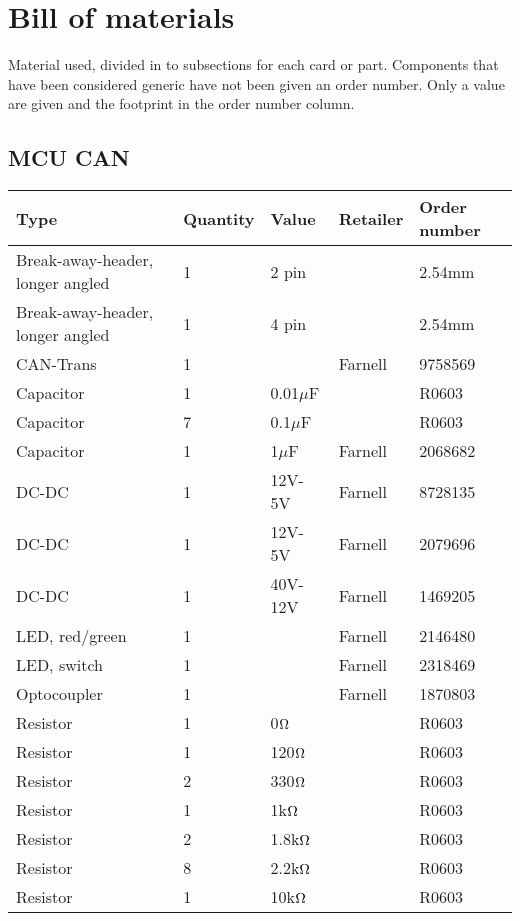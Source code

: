 \documentclass[10pt, titlepage]{article}
\begin{document}
\section{Bill of materials}
\label{Bill of material}
Material used, divided in to subsections for each card or part. Components that have been considered generic have not been given an order number. Only a value are given and the footprint in the order number column.
 
\subsection{MCU CAN}
\begin{center}
\begin{tabularx}{\textwidth}{|X|l|l|l|l|}
\hline
\textbf{Type} & \textbf{Quantity} & \textbf{Value} & \textbf{Retailer} & \textbf{Order number} \\ \hline
Break-away-header, longer angled & 1 & 2 pin & & 2.54mm \\ \hline
Break-away-header, longer angled & 1 & 4 pin & & 2.54mm\\ \hline
CAN-Trans & 1 & & Farnell & 9758569	\\ \hline
Capacitor & 1 & 0.01$\mu$F & & R0603 \\ \hline
Capacitor & 7 & 0.1$\mu$F & & R0603 \\ \hline
Capacitor & 1 & 1$\mu$F & Farnell & 2068682 \\ \hline
DC-DC & 1 & 12V-5V & Farnell & 8728135	\\ \hline
DC-DC & 1 & 12V-5V & Farnell & 2079696 \\ \hline
DC-DC & 1 & 40V-12V & Farnell & 1469205 \\ \hline
LED, red/green & 1 & & Farnell & 2146480 \\ \hline
LED, switch	& 1	& & Farnell & 2318469 \\ \hline
Optocoupler & 1 & & Farnell	& 1870803 \\ \hline
Resistor & 1 & 0$\ohm$ & & R0603 \\ \hline
Resistor & 1 & 120$\ohm$& & R0603 \\ \hline
Resistor & 2 & 330$\ohm$& & R0603 \\ \hline
Resistor & 1 & 1k$\ohm$& & R0603 \\ \hline
Resistor & 2 & 1.8k$\ohm$& & R0603 \\ \hline
Resistor & 8 & 2.2k$\ohm$& & R0603 \\ \hline
Resistor & 1 & 10k$\ohm$&	& R0603	\\ \hline

\end{tabularx}
\end{center}
\end{document}
